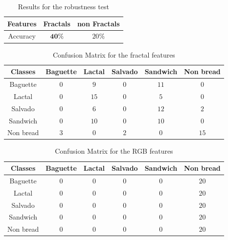 \documentclass[oneside,a4paper,english,links]{amca}
\begin{document}
\begin{table}[htb]
\centering
\begin{tabular}{|c|c|c|}
    \hline
    Features & Fractals & non Fractals\\
    \hline
    \hline
    Accuracy  & $\textbf{40}\%$ & $20\%$\\
    \hline
\end{tabular}
\caption{Results for the robustness test}
\label{table:tableRobustness}
\end{table}


\begin{table}[htb]
\centering
\begin{tabular}{|c|c|c|c|c|c|}
    \hline
    Classes & Baguette & Lactal & Salvado & Sandwich & Non bread\\
    \hline
    \hline
    Baguette    &   $0$  &   $9$  &   $0$  &  $11$ &   $0$\\
    \hline
    Lactal  & $0$ & $15$ & $0$ & $5$ & $0$\\
    \hline
    Salvado & $0$ & $6$ & $0$ & $12$ & $2$\\
    \hline
    Sandwich  & $0$ & $10$ & $0$ & $10$ & $0$\\
    \hline
    Non bread  & $3$ & $0$ & $2$ & $0$ & $15$\\
    \hline
\end{tabular}
\caption{Confusion Matrix for the fractal features}
\label{table:ConfusionMatrixFractal}
\end{table}

\begin{table}[htb]
\centering
\begin{tabular}{|c|c|c|c|c|c|}
    \hline
    Classes & Baguette & Lactal & Salvado & Sandwich & Non bread\\
    \hline
    \hline
    Baguette  & $0$ & $0$ & $0$ & $0$ & $20$\\
    \hline
    Lactal  & $0$ & $0$ & $0$ & $0$ & $20$\\
    \hline
    Salvado & $0$ & $0$ & $0$ & $0$ & $20$\\
    \hline
    Sandwich  & $0$ & $0$ & $0$ & $0$ & $20$\\
    \hline
    Non bread  & $0$ & $0$ & $0$ & $0$ & $20$\\
    \hline
\end{tabular}
\caption{Confusion Matrix for the RGB features}
\label{table:ConfusionMatrixNonFractal}
\end{table}
\end{document}
